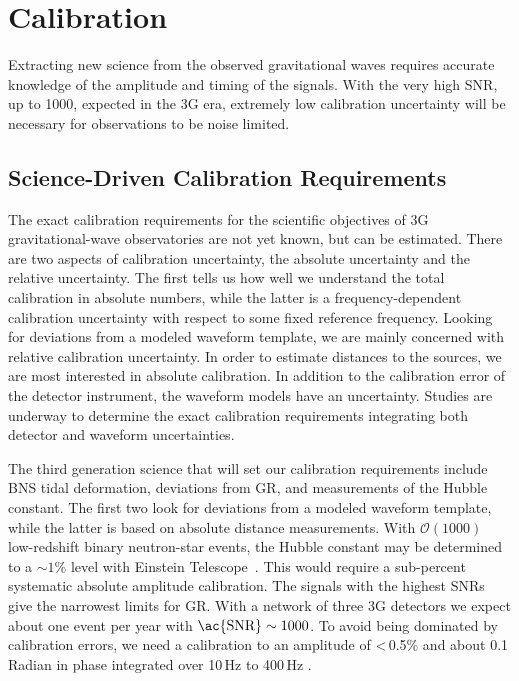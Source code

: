 \chapter{Calibration}
\label{sec:Calibration}


Extracting new science from the observed gravitational waves requires accurate knowledge of the amplitude and timing of the signals. With the very high \ac{SNR}, up to 1000, expected in the \ac{3G}   era, extremely low calibration uncertainty will be necessary for observations to be noise limited.

\section{Science-Driven Calibration Requirements}
The exact calibration requirements for the scientific objectives of \ac{3G}   gravitational-wave observatories are not yet known, but can be estimated. There are two aspects of calibration uncertainty, the absolute uncertainty and the relative uncertainty. The first tells us how well we understand the total calibration in absolute numbers, while the latter is a frequency-dependent calibration uncertainty with respect to some fixed reference frequency. 
Looking for deviations from a modeled waveform template, we are mainly concerned with relative calibration uncertainty. In order to estimate distances to the sources, we are most interested in absolute calibration.
In addition to the calibration error of the detector instrument, the waveform models have an uncertainty.
Studies are underway to determine the exact calibration requirements integrating both detector and waveform uncertainties.

The third generation science that will set our calibration requirements include \ac{BNS} tidal deformation, deviations from \ac{GR}, and measurements of the Hubble constant. The first two look for deviations from a modeled waveform template, while the latter is based on absolute distance measurements. With $\mathcal{O}(1000)$ low-redshift binary neutron-star events, the Hubble constant may be determined to a ${\sim}1\%$ level with Einstein Telescope~\cite{Cai:2016sby}.
This would require a sub-percent systematic absolute amplitude calibration.
The signals with the highest \acp{SNR} give the narrowest limits for \ac{GR}. With a network of three \ac{3G}   detectors we expect about one event per year with $\text{\ac{SNR}} \sim 1000$. To avoid being dominated by calibration errors, we need a calibration to an amplitude of <\,0.5\% and
about 0.1 Radian in phase integrated over 10\,Hz to 400\,Hz \cite{SathyaPers2019}.

